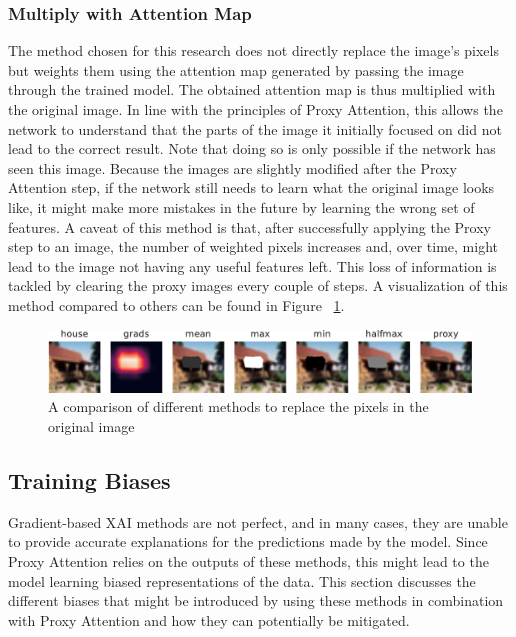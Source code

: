 \subsubsection{Multiply with Attention Map}
The method chosen for this research does not directly replace the image's pixels but weights them using the attention map generated by passing the image through the trained model.
The obtained attention map is thus multiplied with the original image. In line with the principles of Proxy Attention, this allows the network to understand that the parts of the image it initially focused on did not lead to the correct result. Note that doing so is only possible if the network has seen this image. Because the images are slightly modified after the Proxy Attention step, if the network still needs to learn what the original image looks like, it might make more mistakes in the future by learning the wrong set of features.
A caveat of this method is that, after successfully applying the Proxy step to an image, the number of weighted pixels increases and, over time, might lead to the image not having any useful features left. This loss of information is tackled by clearing the proxy images every couple of steps.
A visualization of this method compared to others can be found in Figure ~\ref{fig:methods}.

\begin{figure}[h]
    \centering
    \includegraphics[width=1\textwidth]{images/methods.pdf}
    \caption{A comparison of different methods to replace the pixels in the original image}
    \label{fig:methods}
\end{figure}

\subsection{Training Biases}
Gradient-based XAI methods are not perfect, and in many cases, they are unable to provide accurate explanations for the predictions made by the model. Since Proxy Attention relies on the outputs of these methods, this might lead to the model learning biased representations of the data. This section discusses the different biases that might be introduced by using these methods in combination with Proxy Attention and how they can potentially be mitigated.

